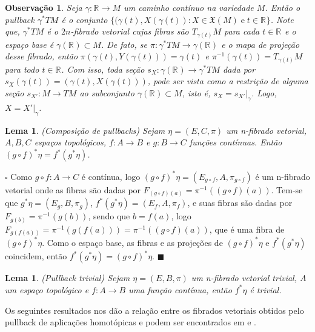 \documentclass[12pt]{book}
\newtheorem{lema}[teorema]{Lema}
\newtheorem{observacao}[teorema]{Observação}
\newenvironment{prova}[1]{$\square$ #1}{\hfill$\blacksquare$}
\newcommand{\campossuaves}[1]{\mathfrak{X}(#1)}
\newcommand{\espacotangenteponto}[2]{T_{#1}#2}
\newcommand{\pullbackfibradotangente}[2]{#1^{*}T#2}
\newcommand{\pullbackfibradotangenteM}[1]{\pullbackfibradotangente{#1}{M}}
\newcommand{\real}[1]{\mathbb{R}^{#1}}
\newcommand{\reta}{\real{}}
\begin{document}
	\begin{observacao}\label{observacao_pullback_fibrado_tangente}
		Seja $\gamma:\reta \to M$ um caminho contínuo na variedade $M$. Então o pullback $\pullbackfibradotangenteM{\gamma}$ é o conjunto $\{(\gamma(t), X(\gamma(t)): X\in \campossuaves{M} \; \text{e}\; t \in \reta \}$. Note que, $\pullbackfibradotangenteM{\gamma}$ é o $2n$-fibrado vetorial cujas fibras são $\espacotangenteponto{\gamma(t)}{M}$ para cada $t\in \reta$ e o espaço base é $\gamma(\reta)\subset M$. De fato, se $\pi: \pullbackfibradotangenteM{\gamma} \to \gamma(\reta)$ e o mapa de projeção desse fibrado, então $\pi(\gamma(t), Y(\gamma(t))) = \gamma(t)$ e $\pi^{-1}(\gamma(t)) = \espacotangenteponto{\gamma(t)}{M}$ para todo $t\in \reta$. Com isso, toda seção $s_{X}: \gamma(\reta)\to \pullbackfibradotangenteM{\gamma}$ dada por $s_{X}(\gamma(t)) = (\gamma(t), X(\gamma(t)))$, pode ser vista como a restrição de alguma seção $s_{X'}: M\to TM$ ao subconjunto $\gamma(\reta) \subset M$, isto é, $s_{X}= s_{X'}|_{\gamma}$. Logo, $X=X'|_{\gamma}$.
	\end{observacao}
	
	\begin{lema}\label{pullback_composicao}
		(Composição de pullbacks) Sejam $\eta =(E, C, \pi)$ um n-fibrado vetorial, $A, B, C$ espaços topológicos, $f:A\to B$ e $g:B\to C$ funções contínuas. Então $(g\circ f)^{*} \eta= f^{*}(g^{*}\eta)$.
	\end{lema}
	\begin{prova}
		Como $g\circ f:A\to C$ é contínua, logo $(g\circ f)^{*}\eta = (E_{g\circ f}, A, \pi_{g\circ f})$ é um n-fibrado vetorial onde as fibras são dadas por $F_{(g\circ f)(a)} = \pi^{-1}((g\circ f)(a))$. Tem-se que $g^{*}\eta=(E_{g}, B, \pi_{g})$, $f^{*}(g^{*}\eta) = (E_{f}, A, \pi_{f})$, e suas fibras são dadas por $F_{g(b)} = \pi^{-1}(g(b))$, sendo que $b=f(a)$, logo  $F_{g(f(a))} = \pi^{-1}(g(f(a))) = \pi^{-1}((g \circ f)(a))$, que é uma fibra de $(g\circ f)^{*}\eta$. Como o espaço base, as fibras e as projeções de $(g\circ f)^{*}\eta$ e $f^{*}(g^{*}\eta)$ coincidem, então $f^{*}(g^{*}\eta) = (g\circ f)^{*}\eta$.
	\end{prova}
	\begin{lema}\label{pullback_trivial}
		(Pullback trivial) Sejam $\eta = (E, B, \pi)$ um n-fibrado vetorial trivial, $A$ um espaço topológico e $f:A\to B$ uma função contínua, então $f^{*}\eta$ é trivial.
	\end{lema}
	
	Os seguintes resultados nos dão a relação entre os fibrados vetoriais obtidos pelo pullback de aplicações homotópicas e podem ser encontrados em \cite{nakahara} e \cite{steenrod_fibre_bundles}.
	
\end{document}
